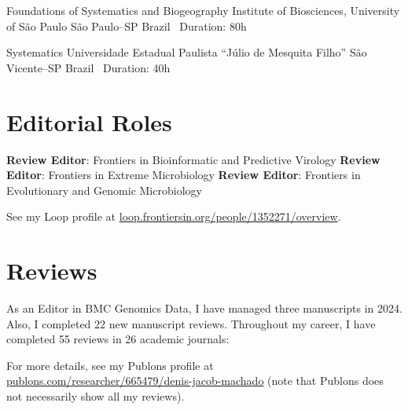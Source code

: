 \documentclass[11pt, letterpaper, sans]{moderncv}
\begin{document}
		{Foundations of Systematics and Biogeography}
		{Institute of Biosciences, University of São Paulo}
		{São Paulo--SP}
		{Brazil}
		{
			\textbullet~Duration: 80h
		}

		{Systematics}
		{Universidade Estadual Paulista ``Júlio de Mesquita Filho''}
		{São Vicente--SP}
		{Brazil}
		{
			\textbullet~Duration: 40h
		}


\section{Editorial Roles}


	    {\textbf{Review Editor}: Frontiers in Bioinformatic and Predictive Virology}
	\cvline{---}
	    {\textbf{Review Editor}: Frontiers in Extreme Microbiology}
	\cvline{---}
	    {\textbf{Review Editor}: Frontiers in Evolutionary and Genomic Microbiology}

\vspace{0.5em}

See my Loop profile at  \href{https://loop.frontiersin.org/people/1352271/overview}{loop.frontiersin.org/people/1352271/overview}.

\section{Reviews}

    As an Editor in BMC Genomics Data, I have managed three manuscripts in 2024. Also, I completed 22 new manuscript reviews. Throughout my career, I have completed 55 reviews in 26 academic journals:\\
    \begin{multicols}{2}
    {\footnotesize
    }
    \end{multicols}
    For more details, see my Publons profile at  \href{https://publons.com/researcher/665479/denis-jacob-machado/}{publons.com/researcher/665479/denis-jacob-machado} (note that Publons does not necessarily show all my reviews).
\end{document}
